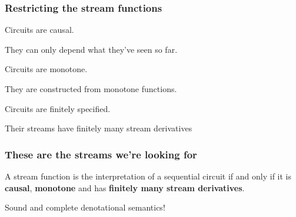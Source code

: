 \begin{frame}
    \frametitle{Restricting the stream functions}

    \await
    \Large
    Circuits are \alert{causal}.

    \await

    \normalsize
    They can only depend \alert{what they've seen so far}.

    \await

    \Large
    Circuits are \alert{monotone}.

    \await

    \normalsize
    They are constructed from \alert{monotone functions}.

    \await

    \Large
    Circuits are \alert{finitely specified}.

    \normalsize
    Their streams have \alert{finitely many stream derivatives}


\end{frame}
\begin{frame}
    \frametitle{These are the streams we're looking for}

    \Large

    \begin{theorem}
        A stream function is the interpretation of a sequential circuit
        if and only if it is \textbf{causal}, \textbf{monotone} and has
        \textbf{finitely many stream derivatives}.
    \end{theorem}

    \await

    \LARGE
    Sound and complete
    \alert{denotational semantics}!
\end{frame}
